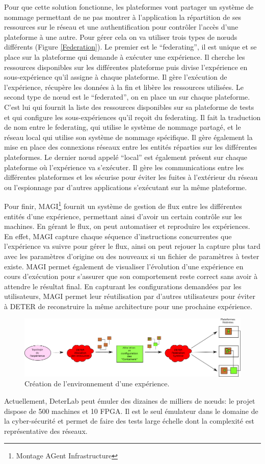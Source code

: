 Pour que cette solution fonctionne, les plateformes vont partager un système de
nommage permettant de ne pas montrer à l'application la répartition de ses
ressources sur le réseau et une authentification pour contrôler l'accès d'une
plateforme à une autre. Pour gérer cela on va utiliser trois types de n\oe uds
différents (Figure \ref{Federation}). Le premier est le ``federating'', il est
unique et se place sur la plateforme qui demande à exécuter une expérience. Il
cherche les ressources disponibles sur les différentes plateforme puis divise
l'expérience en sous-expérience qu'il assigne à chaque plateforme. Il gère
l'exécution de l'expérience, récupère les données à la fin et
libère les ressources utilisées. Le second type de n\oe ud est le ``federated'',
on en place un sur chaque plateforme. C'est lui qui fournit la liste des
ressources disponibles sur sa plateforme de tests et qui configure les
sous-expériences qu'il reçoit du federating. Il fait la traduction de nom entre
le federating, qui utilise le système de nommage partagé, et le réseau local qui
utilise son système de nommage spécifique.  Il gère également la mise en place
des connexions réseaux entre les entités réparties sur les différentes
plateformes. Le dernier n\oe ud appelé ``local'' est également présent sur
chaque plateforme où l'expérience va s'exécuter. Il gère les communications
entre les différentes plateformes et les sécurise pour éviter les fuites à
l'extérieur du réseau ou l'espionnage par d'autres applications s'exécutant sur
la même plateforme.

Pour finir, MAGI\footnote{Montage AGent Infrastructure} fournit un système de
gestion de flux entre les différentes entités d'une expérience, permettant ainsi
d'avoir un certain contrôle sur les machines. En gérant le flux, on peut
automatiser et reproduire les expériences. En effet, MAGI capture chaque
séquence d'instructions concurrentes que l'expérience va suivre pour gérer le
flux, ainsi on peut rejouer la capture plus tard avec les paramètres d'origine
ou des nouveaux si un fichier de paramètres à tester existe. MAGI permet
également de visualiser l'évolution d'une expérience en cours d'exécution pour
s'assurer que son comportement reste correct sans avoir à attendre le résultat
final. En capturant les configurations demandées par les utilisateurs, MAGI
permet leur réutilisation par d'autres utilisateurs pour éviter à DETER de
reconstruire la même architecture pour une prochaine expérience.

\begin{figure}[H]
\centering
\includegraphics[scale=0.63]{Pictures/png/Deter_fonctionnement_general}
\caption{Création de l'environnement d'une expérience.}
\label{Deter_fonc}
\end{figure}

 Actuellement, DeterLab peut émuler des dizaines de milliers de n\oe uds: le
 projet dispose de 500 machines et 10 FPGA. Il est le seul émulateur dans le
 domaine de la cyber-sécurité et permet de faire des tests large échelle dont la
 complexité est représentative des réseaux.

